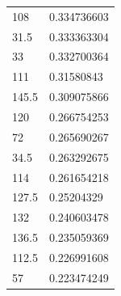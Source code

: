 \begin{longtable}{|l|l|}
 \rowcolor[HTML]{F8FF00} 
 108                                                     & 0.334736603                                                   \\
 \rowcolor[HTML]{F8FF00} 
 31.5                                                    & 0.333363304                                                   \\
 \rowcolor[HTML]{F8FF00} 
 33                                                      & 0.332700364                                                   \\
 \rowcolor[HTML]{F8FF00} 
 111                                                     & 0.31580843                                                    \\
 \rowcolor[HTML]{F8FF00} 
 145.5                                                   & 0.309075866                                                   \\
 \rowcolor[HTML]{F8FF00} 
 120                                                     & 0.266754253                                                   \\
 \rowcolor[HTML]{F8FF00} 
 72                                                      & 0.265690267                                                   \\
 \rowcolor[HTML]{F8FF00} 
 34.5                                                    & 0.263292675                                                   \\
 \rowcolor[HTML]{F8FF00} 
 114                                                     & 0.261654218                                                   \\
 \rowcolor[HTML]{F8FF00} 
 127.5                                                   & 0.25204329                                                    \\
 \rowcolor[HTML]{F8FF00} 
 132                                                     & 0.240603478                                                   \\
 \rowcolor[HTML]{F8FF00} 
 136.5                                                   & 0.235059369                                                   \\
 \rowcolor[HTML]{F8FF00} 
 112.5                                                   & 0.226991608                                                   \\
 \rowcolor[HTML]{F8FF00} 
 57                                                      & 0.223474249                                                   \\

\end{longtable}
